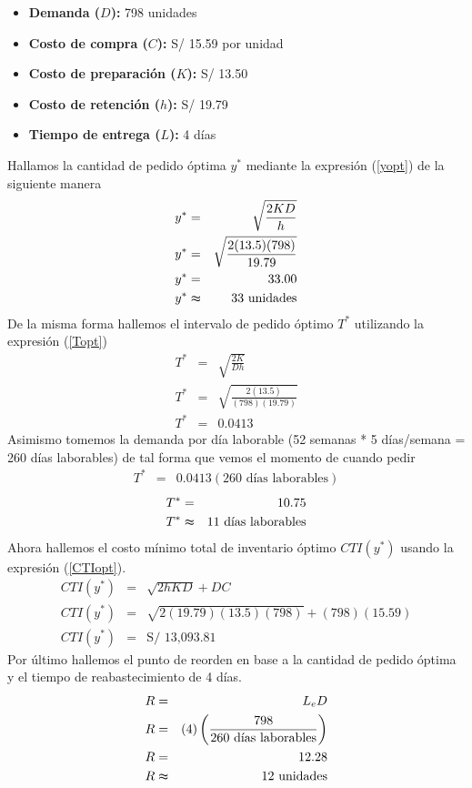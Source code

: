 \begin{itemize}
    \item \textbf{Demanda ($D$):} 798 unidades
    \item \textbf{Costo de compra ($C$):} S/ 15.59 por unidad
    \item \textbf{Costo de preparación ($K$):} S/ 13.50
    \item \textbf{Costo de retención ($h$):} S/ 19.79
    \item \textbf{Tiempo de entrega ($L$):} 4 días
\end{itemize}

Hallamos la cantidad de pedido óptima $y^*$ mediante la expresión (\ref{yopt}) de la siguiente manera
\begin{eqnarray}
    y^* &=& \sqrt{\frac{2KD}{h}} \nonumber \\
    y^* &=& \sqrt{\frac{2(13.5)(798)}{19.79}} \nonumber \\
    y^* &=& 33.00 \nonumber \\
    y^* &\thickapprox& 33 \text{ unidades} \nonumber
\end{eqnarray}
De la misma forma hallemos el intervalo de pedido óptimo $T^*$ utilizando la expresión (\ref{Topt}) 
\begin{eqnarray}
    T^* &=& \sqrt{\frac{2K}{Dh}} \nonumber \\
    T^* &=& \sqrt{\frac{2(13.5)}{(798)(19.79)}} \nonumber \\
    T^* &=& 0.0413 \nonumber
\end{eqnarray}
Asimismo tomemos la demanda por día laborable (52 semanas * 5 días/semana = 260 días laborables) de tal forma que vemos el momento de cuando pedir
\begin{eqnarray}
    T^* &=& 0.0413 (260 \text{ días laborables}) \nonumber
\end{eqnarray}
\begin{eqnarray}
    T^* &=& 10.75 \nonumber \\
    T^* &\thickapprox& 11 \text{ días laborables} \nonumber
\end{eqnarray}
Ahora hallemos el costo mínimo total de inventario óptimo $CTI(y^*)$ usando la expresión (\ref{CTIopt}).
\begin{eqnarray}
    CTI(y^*) &=& \sqrt{2hKD} + DC \nonumber \\
    CTI(y^*) &=& \sqrt{2(19.79)(13.5)(798)} + (798)(15.59) \nonumber \\
    CTI(y^*) &=& \text{S/ 13,093.81} \nonumber
\end{eqnarray}
Por último hallemos el punto de reorden en base a la cantidad de pedido óptima y el tiempo de reabastecimiento de 4 días.
\begin{eqnarray}
    R &=& L_e D \nonumber \\
    R &=& (4) \left(\frac{798}{260 \text{ días laborables}} \right) \nonumber \\
    R &=& 12.28 \nonumber \\
    R &\thickapprox& 12 \text{ unidades} \nonumber
\end{eqnarray}

